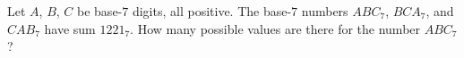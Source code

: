 Let $A$, $B$, $C$ be base-$7$ digits, all positive. The base-$7$ numbers $ABC_7$, $BCA_7$, and $CAB_7$ have sum $1221_7$. How many possible values are there for the number $ABC_7$?

